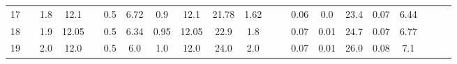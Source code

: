\documentclass[a4paper,12pt]{article}
\begin{document}
\begin{table}[htp]
\begin{adjustwidth}{-2.2cm}{}
\begin{tabular}{|c|c|c|c|c|c|c|c|c|c|c|c|c|c|c|c|c|c|c|c|c|}
17    &                      & 1.8 & 12.1  &                       & 0.5  & 6.72  & 0.9  & 12.1  & 21.78 & 1.62 &                        &                         & 0.06      & 0.0       & 23.4 & 0.07   & 6.44       &                       &                       &                       \\ \cline{1-1} \cline{3-4} \cline{6-11} \cline{14-18}
18    &                      & 1.9 & 12.05 &                       & 0.5  & 6.34  & 0.95 & 12.05 & 22.9  & 1.8  &                        &                         & 0.07      & 0.01      & 24.7 & 0.07   & 6.77       &                       &                       &                       \\ \cline{1-1} \cline{3-4} \cline{6-11} \cline{14-18}
19    &                      & 2.0 & 12.0  &                       & 0.5  & 6.0   & 1.0  & 12.0  & 24.0  & 2.0  &                        &                         & 0.07      & 0.01      & 26.0 & 0.08   & 7.1        &                       &                       &                       \\ \hline
\end{tabular}
\end{adjustwidth}

\end{table}

























\newpage
{}
\recalctypearea
\end{document}
